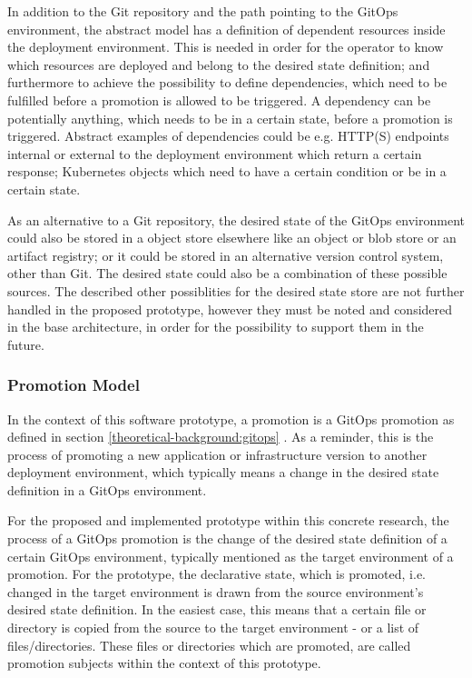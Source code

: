In addition to the Git repository and the path pointing to the GitOps environment,
the abstract model has a definition of dependent resources inside the deployment environment.
This is needed in order for the operator to know which resources are deployed and belong to the desired state definition;
and furthermore to achieve the possibility to define dependencies,
which need to be fulfilled before a promotion is allowed to be triggered.
A dependency can be potentially anything, which needs to be in a certain state, before a promotion is triggered.
Abstract examples of dependencies could be e.g.
HTTP(S) endpoints internal or external to the deployment environment which return a certain response;
Kubernetes objects which need to have a certain condition or be in a certain state.

As an alternative to a Git repository,
the desired state of the GitOps environment could also be stored in a object store elsewhere
like an object or blob store or an artifact registry;
or it could be stored in an alternative version control system, other than Git.
The desired state could also be a combination of these possible sources.
The described other possiblities for the desired state store are not further handled in the proposed prototype,
however they must be noted and considered in the base architecture, in order for the possibility to support
them in the future.

\subsubsection*{Promotion Model}

In the context of this software prototype,
a promotion is a GitOps promotion as defined in section
\ref{theoretical-background:gitops} .
As a reminder, this is the process of promoting a new application or infrastructure version
to another deployment environment, which typically means a change in the desired state definition in a GitOps environment.

For the proposed and implemented prototype within this concrete research,
the process of a GitOps promotion is the change of the desired state definition of a certain GitOps environment,
typically mentioned as the target environment of a promotion. For the prototype,
the declarative state, which is promoted, i.e. changed in the target environment is drawn from the
source environment's desired state definition. In the easiest case, this means that a certain
file or directory is copied from the source to the target environment - or a list of files/directories.
These files or directories which are promoted, are called promotion subjects within the context of this
prototype.

